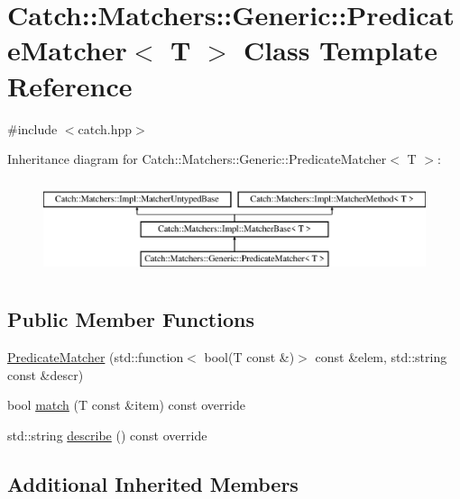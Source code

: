 \hypertarget{class_catch_1_1_matchers_1_1_generic_1_1_predicate_matcher}{}\section{Catch\+:\+:Matchers\+:\+:Generic\+:\+:Predicate\+Matcher$<$ T $>$ Class Template Reference}
\label{class_catch_1_1_matchers_1_1_generic_1_1_predicate_matcher}


{\ttfamily \#include $<$catch.\+hpp$>$}

Inheritance diagram for Catch\+:\+:Matchers\+:\+:Generic\+:\+:Predicate\+Matcher$<$ T $>$\+:\begin{figure}[H]
\begin{center}
\leavevmode
\includegraphics[height=2.790698cm]{class_catch_1_1_matchers_1_1_generic_1_1_predicate_matcher}
\end{center}
\end{figure}
\subsection*{Public Member Functions}
\begin{DoxyCompactItemize}
\item 
\mbox{\hyperlink{class_catch_1_1_matchers_1_1_generic_1_1_predicate_matcher_a57d53ef028c2f7b92b016f627f91aa76}{Predicate\+Matcher}} (std\+::function$<$ bool(T const \&)$>$ const \&elem, std\+::string const \&descr)
\item 
bool \mbox{\hyperlink{class_catch_1_1_matchers_1_1_generic_1_1_predicate_matcher_a2ec0e8ec19c4c5e26271d59a06a62b52}{match}} (T const \&item) const override
\item 
std\+::string \mbox{\hyperlink{class_catch_1_1_matchers_1_1_generic_1_1_predicate_matcher_af7d59e94892cc09471bbaefac4c889fd}{describe}} () const override
\end{DoxyCompactItemize}
\subsection*{Additional Inherited Members}


